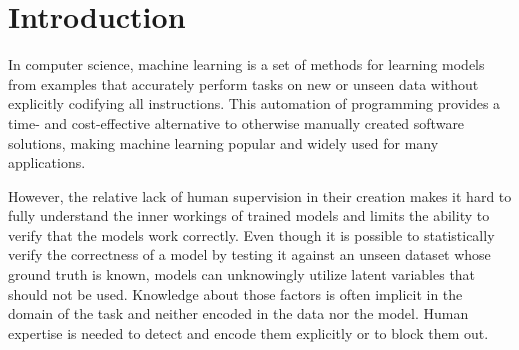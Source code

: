 \chapter{Introduction}
In computer science, machine learning is a set of methods for learning models from examples that accurately perform tasks on new or unseen data without explicitly codifying all instructions. This automation of programming provides a time- and cost-effective alternative to otherwise manually created software solutions, making machine learning popular and widely used for many applications.

However, the relative lack of human supervision in their creation makes it hard to fully understand the inner workings of trained models and limits the ability to verify that the models work correctly. Even though it is possible to statistically verify the correctness of a model by testing it against an unseen dataset whose ground truth is known, models can unknowingly utilize latent variables that should not be used. Knowledge about those factors is often implicit in the domain of the task and neither encoded in the data nor the model. Human expertise is needed to detect and encode them explicitly or to block them out.





% 


